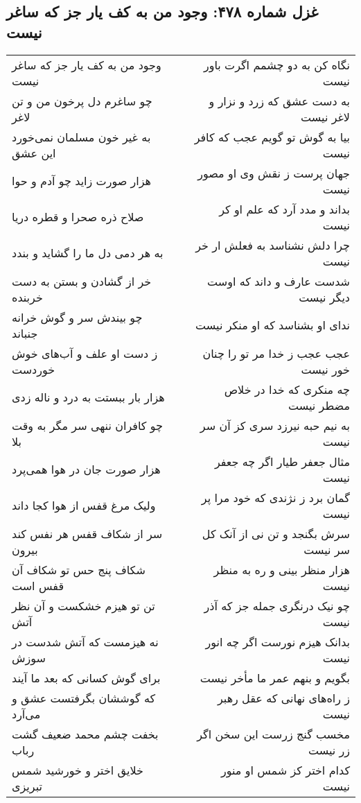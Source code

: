 \begin{center}
\section*{غزل شماره ۴۷۸: وجود من به کف یار جز که ساغر نیست}
\label{sec:0478}
\begin{longtable}{l p{0.5cm} r}
وجود من به کف یار جز که ساغر نیست
&&
نگاه کن به دو چشمم اگرت باور نیست
\\
چو ساغرم دل پرخون من و تن لاغر
&&
به دست عشق که زرد و نزار و لاغر نیست
\\
به غیر خون مسلمان نمی‌خورد این عشق
&&
بیا به گوش تو گویم عجب که کافر نیست
\\
هزار صورت زاید چو آدم و حوا
&&
جهان پرست ز نقش وی او مصور نیست
\\
صلاح ذره صحرا و قطره دریا
&&
بداند و مدد آرد که علم او کر نیست
\\
به هر دمی دل ما را گشاید و بندد
&&
چرا دلش نشناسد به فعلش ار خر نیست
\\
خر از گشادن و بستن به دست خربنده
&&
شدست عارف و داند که اوست دیگر نیست
\\
چو بیندش سر و گوش خرانه جنباند
&&
ندای او بشناسد که او منکر نیست
\\
ز دست او علف و آب‌های خوش خوردست
&&
عجب عجب ز خدا مر تو را چنان خور نیست
\\
هزار بار ببستت به درد و ناله زدی
&&
چه منکری که خدا در خلاص مضطر نیست
\\
چو کافران ننهی سر مگر به وقت بلا
&&
به نیم حبه نیرزد سری کز آن سر نیست
\\
هزار صورت جان در هوا همی‌پرد
&&
مثال جعفر طیار اگر چه جعفر نیست
\\
ولیک مرغ قفس از هوا کجا داند
&&
گمان برد ز نژندی که خود مرا پر نیست
\\
سر از شکاف قفس هر نفس کند بیرون
&&
سرش بگنجد و تن نی از آنک کل سر نیست
\\
شکاف پنج حس تو شکاف آن قفس است
&&
هزار منظر بینی و ره به منظر نیست
\\
تن تو هیزم خشکست و آن نظر آتش
&&
چو نیک درنگری جمله جز که آذر نیست
\\
نه هیزمست که آتش شدست در سوزش
&&
بدانک هیزم نورست اگر چه انور نیست
\\
برای گوش کسانی که بعد ما آیند
&&
بگویم و بنهم عمر ما مأخر نیست
\\
که گوششان بگرفتست عشق و می‌آرد
&&
ز راه‌های نهانی که عقل رهبر نیست
\\
بخفت چشم محمد ضعیف گشت رباب
&&
مخسب گنج زرست این سخن اگر زر نیست
\\
خلایق اختر و خورشید شمس تبریزی
&&
کدام اختر کز شمس او منور نیست
\\
\end{longtable}
\end{center}
